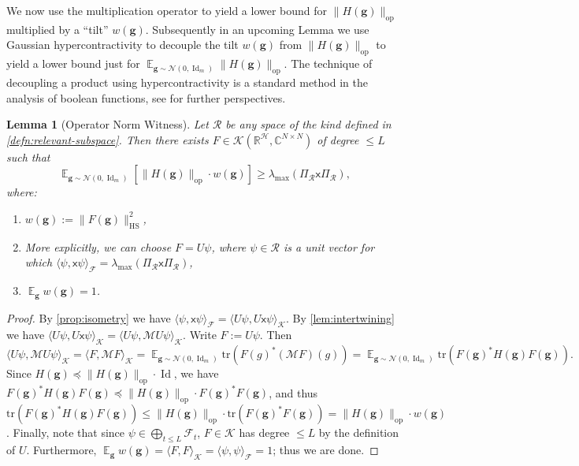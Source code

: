 \documentclass
[11pt,letterpaper]
{article}
\newtheorem{lemma}[theorem]{Lemma}
\theoremstyle{definition}
\newcommand{\cN}{\mathcal{N}}
\newcommand{\sfx}{\mathsf x}
\newcommand{\R}{{\mathbb R}}
\newcommand{\cF}{{\mathcal F}}
\newcommand{\1}{\mathbf{1}}
\newcommand{\tr}{\mathrm{tr}}
\newcommand{\C}{\mathbb C}
\newcommand{\cH}{\mathcal H}
\newcommand{\Id}{\operatorname{Id}}
\DeclareMathOperator*{\E}{\mathbb{E}}
\newcommand{\cR}{\mathcal R}
\newcommand{\cK}{\mathcal K}
\newcommand{\cM}{\mathcal M}
\renewcommand{\geq}{\geqslant}
\renewcommand{\leq}{\leqslant}
\renewcommand{\preceq}{\preccurlyeq}
\begin{document}
We now use the multiplication operator to yield a lower bound for $\|H(\bm g)\|_{\operatorname{op}}$ multiplied by a ``tilt'' $w(\bm g)$. Subsequently in an upcoming Lemma we use Gaussian hypercontractivity to decouple the tilt $w(\bm g)$ from $\|H(\bm g)\|_{\operatorname{op}}$ to yield a lower bound just for $\E_{\bm g\sim\cN(0, \Id_m)}\|H(\bm g)\|_{\operatorname{op}}$. The technique of decoupling a product using hypercontractivity is a standard method in the analysis of boolean functions, see \cite{ODonnell21} for further perspectives.
\begin{lemma}[Operator Norm Witness] \label{lem:transfer-virtual-to-real}
    Let $\cR$ be any space of the kind defined in \cref{defn:relevant-subspace}. Then there exists $F\in\cK(\R^\cH, \C^{N\times N})$ of degree $\leq L$ such that 
    \[\E_{\bm g\sim\cN(0, \Id_m)}\left[\|H(\bm g)\|_{\operatorname{op}}\cdot w(\bm g)\right]\geq \lambda_{\max}(\Pi_\cR \sfx\Pi_\cR),\]
    where:
    \begin{enumerate}[(1)]
        \item $w(\bm g) := \|F(\bm g)\|_{\operatorname{HS}}^2$,
        \item More explicitly, we can choose $F = U\psi$, where $\psi\in\cR$ is a unit vector for which $\langle\psi, \sfx\psi\rangle_{\cF} = \lambda_{\max}(\Pi_\cR \sfx\Pi_\cR)$, 
        \item $\E_{\bm g}w(\bm g) = 1$.
    \end{enumerate}
\end{lemma}
\begin{proof}
    By \cref{prop:isometry} we have $\langle\psi, \sfx\psi\rangle_{\cF} = \langle U\psi, U\sfx\psi\rangle_{\cK}$. By \cref{lem:intertwining} we have $\langle U\psi, U\sfx\psi\rangle_{\cK} = \langle U\psi, \cM U\psi\rangle_{\cK}$. Write $F:= U\psi$. Then 
    \[\langle U\psi, \cM U\psi\rangle_{\cK} = \langle F, \cM F\rangle_{\cK} = \E_{\bm g\sim\cN(0, \Id_m)}\tr(F(g)^*(\cM F)(g)) = \E_{\bm g\sim\cN(0, \Id_m)}\tr(F(\bm g)^*H(\bm g)F(\bm g)).\]
    Since $H(\bm g)\preceq\|H(\bm g)\|_{\operatorname{op}}\cdot\Id$, we have $F(\bm g)^*H(\bm g)F(\bm g)\preceq\|H(\bm g)\|_{\operatorname{op}}\cdot F(\bm g)^*F(\bm g)$, and thus $\tr(F(\bm g)^*H(\bm g)F(\bm g))\leq \|H(\bm g)\|_{\operatorname{op}}\cdot \tr(F(\bm g)^*F(\bm g)) = \|H(\bm g)\|_{\operatorname{op}}\cdot w(\bm g)$. Finally, note that since $\psi\in\bigoplus_{t\leq L}\cF_t$, $F\in\cK$ has degree $\leq L$ by the definition of $U$. Furthermore, $\E_{\bm g}w(\bm g) = \langle F, F\rangle_\cK = \langle\psi,\psi\rangle_\cF = 1$; thus we are done.
\end{proof}
\end{document}
